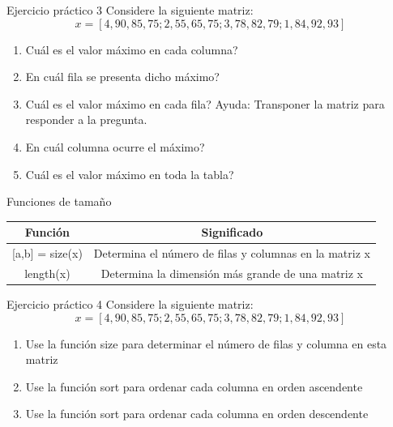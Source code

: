 \documentclass{bredelebeamer}
\begin{document}
\begin{frame}{Ejercicio práctico 3}
Considere la siguiente matriz:
\begin{equation*}
x = [4, 90, 85, 75 ; 2, 55, 65, 75 ; 3, 78, 82, 79 ; 1, 84, 92, 93]
\end{equation*}
\begin{enumerate}
\item Cuál es el valor máximo en cada columna?
\item En cuál fila se presenta dicho máximo?
\item Cuál es el valor máximo en cada fila? Ayuda: Transponer la matriz para responder a la pregunta.
\item En cuál columna ocurre el máximo?
\item Cuál es el valor máximo en toda la tabla?
\end{enumerate}
\end{frame}

\begin{frame}{Funciones de tamaño}
\begin{table}[]
\centering
\begin{tabular}{|c|c|}
\hline
Función             & Significado                                            \\ \hline
{[}a,b{]} = size(x) & Determina el número de filas y columnas en la matriz x \\ \hline
length(x)           & Determina la dimensión más grande de una matriz x      \\ \hline
\end{tabular}
\end{table}
\end{frame}

\begin{frame}{Ejercicio práctico 4}
Considere la siguiente matriz:
\begin{equation*}
x = [4, 90, 85, 75 ; 2, 55, 65, 75 ; 3, 78, 82, 79 ; 1, 84, 92, 93]
\end{equation*}
\begin{enumerate}
\item Use la función size para determinar el número de filas y columna en esta matriz
\item Use la función sort para ordenar cada columna en orden ascendente
\item Use la función sort para ordenar cada columna en orden descendente
\end{enumerate}
\end{frame}
\end{document}
